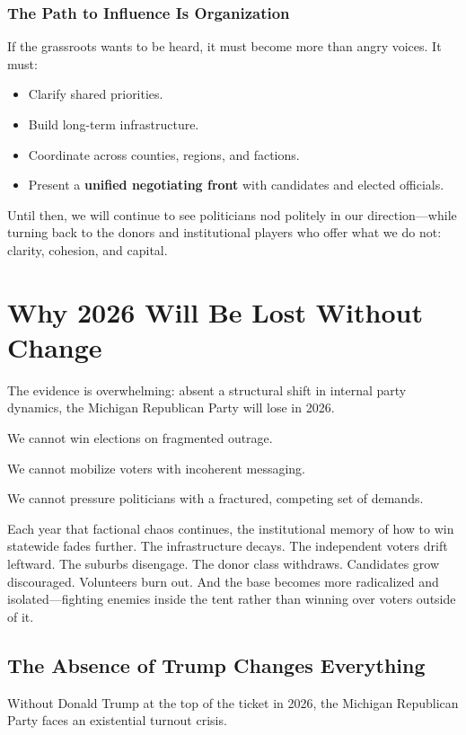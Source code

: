 \subsubsection{The Path to Influence Is Organization}
If the grassroots wants to be heard, it must become more than angry voices. It must:
\begin{itemize}
\item Clarify shared priorities.
\item Build long-term infrastructure.
\item Coordinate across counties, regions, and factions.
\item Present a \textbf{unified negotiating front} with candidates and elected officials.
\end{itemize}

Until then, we will continue to see politicians nod politely in our direction—while turning back to the donors and institutional players who offer what we do not: clarity, cohesion, and capital.


\section{Why 2026 Will Be Lost Without Change}

The evidence is overwhelming: absent a structural shift in internal party dynamics, the Michigan Republican Party will lose in 2026.

We cannot win elections on fragmented outrage.

We cannot mobilize voters with incoherent messaging.

We cannot pressure politicians with a fractured, competing set of demands.

Each year that factional chaos continues, the institutional memory of how to win statewide fades further. The infrastructure decays. The independent voters drift leftward. The suburbs disengage. The donor class withdraws. Candidates grow discouraged. Volunteers burn out. And the base becomes more radicalized and isolated—fighting enemies inside the tent rather than winning over voters outside of it.

\subsection{The Absence of Trump Changes Everything}
Without Donald Trump at the top of the ticket in 2026, the Michigan Republican Party faces an existential turnout crisis.

